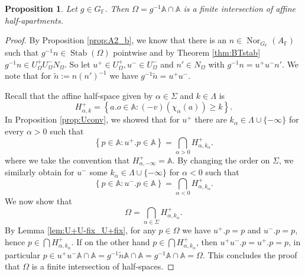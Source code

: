 \documentclass[12pt]{amsart}
\newcommand{\F}{\mathbb{F} }
\newcommand{\A}{\mathbb{A}}
\numberwithin{equation}{section}
\newtheorem{proposition}[theorem]{Proposition}
\theoremstyle{remark} %
\begin{document}
		\begin{proposition}\label{prop:A2_a}
			Let $g\in G_\F$. Then $\Omega = g^{-1}\A \cap \A$ is a finite intersection of affine half-apartments. 
		\end{proposition}
		\begin{proof}
			By Proposition \ref{prop:A2_b}, we know that there is an $n\in \operatorname{Nor}_{G_\F}(A_\F)$ such that $g^{-1}n \in \operatorname{Stab}(\Omega)$ pointwise and by Theorem \ref{thm:BTstab} $g^{-1}n \in U_{\Omega}^+ U_{\Omega}^- N_{\Omega}$. So let $u^+ \in  U_{\Omega}^+, u^- \in  U_{\Omega}^- $ and $n' \in  N_{\Omega}$ with $g^{-1} n = u^+ u^- n'$. We note that for $\tilde{n} := n(n')^{-1}$ we have $g^{-1}\tilde{n} = u^+ u^- $.
			
			Recall that the affine half-space given by $\alpha \in \Sigma$ and $k\in \Lambda$ is
			$$
			H_{\alpha,k}^+ = \left\{ a.o \in \A \colon (-v)(\chi_\alpha(a)) \geq k  \right\}.
			$$
			In Proposition \ref{prop:Uconv}, we showed that for $u^+$ there are $k_\alpha \in \Lambda \cup \{-\infty\}$ for every $\alpha >0$ such that 
			$$
			\left\{ p\in \A \colon u^+.p \in \A \right\} = \bigcap_{\alpha >0} H_{\alpha, k_\alpha}^+.
			$$	
			where we take the convention that $H_{\alpha, -\infty}^+ = \A$. By changing the order on $\Sigma$, we similarly obtain for $u^-$ some $k_\alpha\in \Lambda \cup \{-\infty\}$ for $\alpha <0$ such that
			$$
			\left\{ p\in \A \colon u^-.p \in \A \right\} = \bigcap_{\alpha <0} H_{\alpha, k_\alpha}^+.
			$$
			We now show that
			$$
			\Omega = \bigcap_{\alpha \in \Sigma} H_{\alpha, k_\alpha}^+.
			$$
			By Lemma \ref{lem:U+U-fix_U+fix}, for any $p\in \Omega$ we have $u^+.p =p$  and $u^{-}.p=p$, hence $p \in \bigcap H_{\alpha, k_\alpha}^+$. If on the other hand $p \in \bigcap H_{\alpha, k_\alpha}^+$, then $u^+u^-.p=u^+.p=p$, in particular $p \in u^+u^- \A \cap \A = g^{-1}\tilde{n}\A \cap \A = g^{-1} \A \cap \A = \Omega$. This concludes the proof that $\Omega$ is a finite intersection of half-spaces.
		\end{proof}
		
\end{document}
